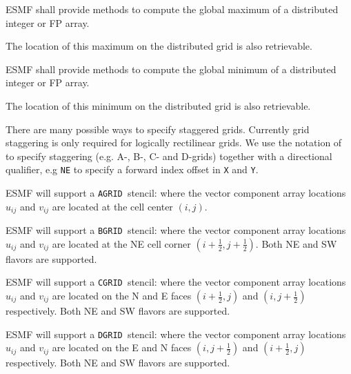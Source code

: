 
ESMF shall provide methods to compute the global maximum of a
distributed integer or FP array.


The location of this maximum on the distributed grid is also
retrievable.


ESMF shall provide methods to compute the global minimum of a
distributed integer or FP array.


The location of this minimum on the distributed grid is also
retrievable.


There are many possible ways to specify staggered grids.  Currently
grid staggering is only required for logically rectilinear grids. We
use the notation of \cite{ref:a1966} to specify staggering (e.g. A-,
B-, C- and D-grids) together with a directional qualifier, e.g
\texttt{NE} to specify a forward index offset in \texttt{X} and
\texttt{Y}.

\newcommand{\agrid}{\texttt{AGRID~}}
\newcommand{\bgrid}{\texttt{BGRID~}}
\newcommand{\cgrid}{\texttt{CGRID~}}
\newcommand{\dgrid}{\texttt{DGRID~}}

\sreq{\agrid}

ESMF will support a \agrid stencil: where the vector
component array locations $u_{ij}$ and $v_{ij}$ are located at the
cell center $(i,j)$.

\sreq{\bgrid}

ESMF will support a \bgrid stencil: where the vector component array
locations $u_{ij}$ and $v_{ij}$ are located at the NE cell corner
$(i+\frac12,j+\frac12)$. Both NE and SW flavors are supported.

\sreq{\cgrid}

ESMF will support a \cgrid stencil: where the vector component array
locations $u_{ij}$ and $v_{ij}$ are located on the N and E faces
$(i+\frac12,j)$ and $(i,j+\frac12)$ respectively. Both NE and SW
flavors are supported.

\sreq{\dgrid}

ESMF will support a \dgrid stencil: where the vector component array
locations $u_{ij}$ and $v_{ij}$ are located on the E and N faces
$(i,j+\frac12)$ and $(i+\frac12,j)$ respectively. Both NE and SW
flavors are supported.

